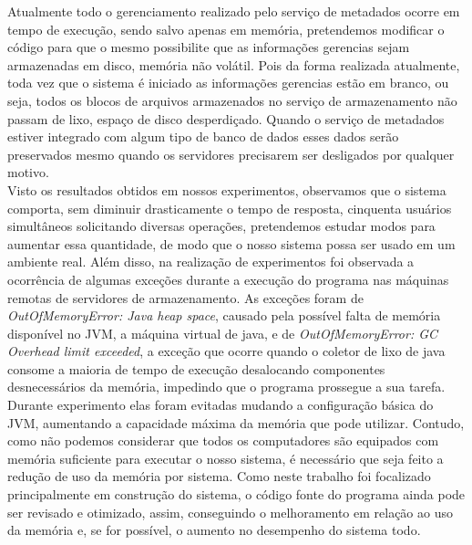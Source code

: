 Atualmente todo o gerenciamento realizado pelo serviço de metadados ocorre em tempo de execução, sendo salvo apenas em memória, pretendemos modificar o código para que o mesmo possibilite que as informações gerencias sejam armazenadas em disco, memória não volátil. Pois da forma realizada atualmente, toda vez que o sistema é iniciado as informações gerencias estão em branco, ou seja, todos os blocos de arquivos armazenados no serviço de armazenamento não passam de lixo, espaço de disco desperdiçado. Quando o serviço de metadados estiver integrado com algum tipo de banco de dados esses dados serão preservados mesmo quando os servidores precisarem ser desligados por qualquer motivo.
\\

Visto os resultados obtidos em nossos experimentos, observamos que o sistema comporta, sem diminuir drasticamente o tempo de resposta, cinquenta usuários simultâneos  solicitando diversas operações, pretendemos estudar modos para aumentar essa quantidade, de modo que o nosso sistema possa ser usado em um ambiente real.
Além disso, na realização de experimentos foi observada a ocorrência de algumas exceções durante a execução do programa nas máquinas remotas de servidores de armazenamento. As exceções foram de \textit{OutOfMemoryError: Java heap space}, causado pela possível falta de memória disponível no JVM, a máquina virtual de java, e de \textit{OutOfMemoryError: GC Overhead limit exceeded}, a exceção que ocorre quando o coletor de lixo de java consome a maioria de tempo de execução desalocando componentes desnecessários da memória, impedindo que o programa prossegue a sua tarefa.
Durante experimento elas foram evitadas mudando a configuração básica do JVM, aumentando a capacidade máxima da memória que pode utilizar. Contudo, como não podemos considerar que todos os computadores são equipados com memória suficiente para executar o nosso sistema, é necessário que seja feito a redução de uso da memória por sistema. 
Como neste trabalho foi focalizado principalmente em construção do sistema, o código fonte do programa ainda pode ser revisado e otimizado, assim, conseguindo o melhoramento em relação ao uso da memória e, se for possível, o aumento no desempenho do sistema todo.
\\


